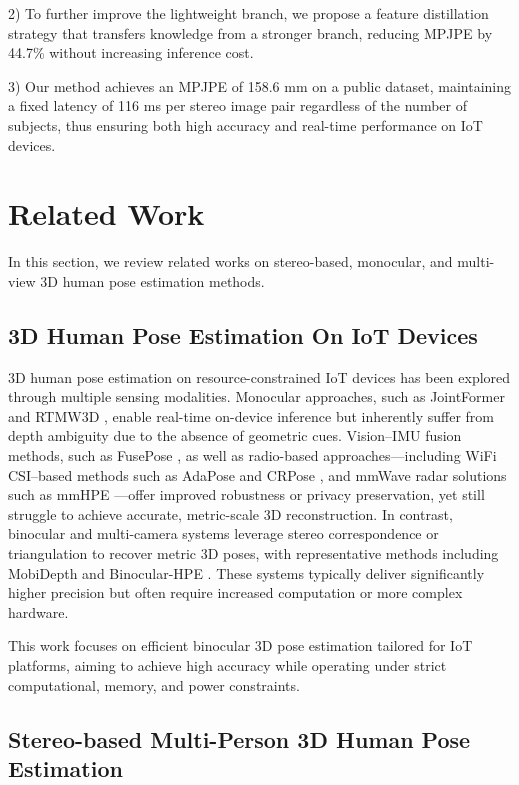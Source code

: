 \documentclass[journal]{IEEEtran}
\begin{document}
2) To further improve the lightweight branch, we propose a feature distillation strategy that transfers knowledge from a stronger branch, reducing MPJPE by 44.7\% without increasing inference cost.

3) Our method achieves an MPJPE of 158.6 mm on a public dataset, maintaining a fixed latency of 116 ms per stereo image pair regardless of the number of subjects, thus ensuring both high accuracy and real-time performance on IoT devices.
\section{Related Work}
In this section, we review related works on stereo-based, monocular, and multi-view 3D human pose estimation methods.
\subsection{3D Human Pose Estimation On IoT Devices}
3D human pose estimation on resource-constrained IoT devices has been explored through multiple sensing modalities. Monocular approaches, such as JointFormer  and RTMW3D , enable real-time on-device inference but inherently suffer from depth ambiguity due to the absence of geometric cues. Vision–IMU fusion methods, such as FusePose , as well as radio-based approaches—including WiFi CSI–based methods such as AdaPose  and CRPose , and mmWave radar solutions such as mmHPE —offer improved robustness or privacy preservation, yet still struggle to achieve accurate, metric-scale 3D reconstruction. In contrast, binocular and multi-camera systems leverage stereo correspondence or triangulation to recover metric 3D poses, with representative methods including MobiDepth  and Binocular-HPE . These systems typically deliver significantly higher precision but often require increased computation or more complex hardware.

This work focuses on efficient binocular 3D pose estimation tailored for IoT platforms, aiming to achieve high accuracy while operating under strict computational, memory, and power constraints.

\subsection{Stereo-based Multi-Person 3D Human Pose Estimation}
\end{document}
